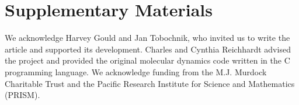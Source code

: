 \documentclass[twocolumn,preprintnumbers,amsmath,amssymb,aps,prx]{revtex4}
\begin{document}

%
%


\section{Supplementary Materials}



\begin{acknowledgments}

  We acknowledge Harvey Gould and Jan Tobochnik,
  who invited us to write the article and
  supported its development.
  Charles and Cynthia Reichhardt advised 
  the project and provided the original molecular dynamics code
  written in the C programming language.
  We acknowledge funding from the M.J. Murdock Charitable Trust
  and the Pacific Research Institute for Science and Mathematics (PRISM).

\end{acknowledgments}
\end{document}
